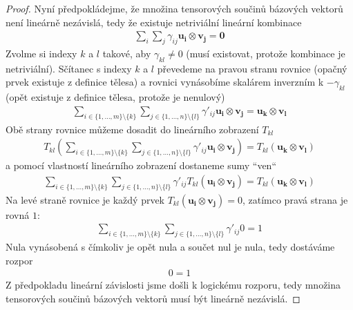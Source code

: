 \documentclass[a5paper,12pt]{amsbook}
\theoremstyle{definition}
\newcommand{\myvec}[1]{\mathbf{#1}}
\begin{document}
\begin{proof}
Nyní předpokládejme, že množina tensorových součinů bázových vektorů není lineárně nezávislá,
tedy že existuje netriviální lineární kombinace
\begin{equation*}
\begin{split}
\sum_{i}\sum_{j}\gamma_{ij}\myvec{u_i}\otimes\myvec{v_j} = \myvec{0}
\end{split}
\end{equation*}
Zvolme si indexy $k$ a $l$ takové, aby $\gamma_{kl} \neq 0$ (musí existovat, protože kombinace
je netriviální). Sčítanec s indexy $k$ a $l$ převedeme na pravou stranu rovnice (opačný prvek
existuje z definice tělesa) a rovnici vynásobíme skalárem inverzním k $-\gamma_{kl}$ (opět
existuje z definice tělesa, protože je nenulový)
\begin{equation*}
\begin{split}
\sum_{i\in\{1, \dots, m\}\setminus\{k\}}
  \sum_{j\in\{1, \dots, n\}\setminus\{l\}}\gamma'_{ij}\myvec{u_i}\otimes\myvec{v_j} 
  = \myvec{u_k}\otimes\myvec{v_l}
\end{split}
\end{equation*}
Obě strany rovnice můžeme dosadit do lineárního zobrazení $T_{kl}$
\begin{equation*}
\begin{split}
T_{kl}(\sum_{i\in\{1, \dots, m\}\setminus\{k\}}
  \sum_{j\in\{1, \dots, n\}\setminus\{l\}}\gamma'_{ij}\myvec{u_i}\otimes\myvec{v_j})
  = T_{kl}(\myvec{u_k}\otimes\myvec{v_l})
\end{split}
\end{equation*}
a pomocí vlastností lineárního zobrazení dostaneme sumy ``ven``
\begin{equation*}
\begin{split}
\sum_{i\in\{1, \dots, m\}\setminus\{k\}}
  \sum_{j\in\{1, \dots, n\}\setminus\{l\}}\gamma'_{ij}T_{kl}(\myvec{u_i}\otimes\myvec{v_j})
  = T_{kl}(\myvec{u_k}\otimes\myvec{v_l})
\end{split}
\end{equation*}
Na levé straně rovnice je každý prvek $T_{kl}(\myvec{u_i}\otimes\myvec{v_j}) = 0$, zatímco
pravá strana je rovná $1$:
\begin{equation*}
\begin{split}
\sum_{i\in\{1, \dots, m\}\setminus\{k\}}
  \sum_{j\in\{1, \dots, n\}\setminus\{l\}}\gamma'_{ij}0 = 1
\end{split}
\end{equation*}
Nula vynásobená s čímkoliv je opět nula a součet nul je nula, tedy dostáváme rozpor
\begin{equation*}
\begin{split}
0 = 1
\end{split}
\end{equation*}
Z předpokladu lineární závislosti jsme došli k logickému rozporu, tedy množina tensorových součinů
bázových vektorů musí být lineárně nezávislá.
\end{proof}
\end{document}
